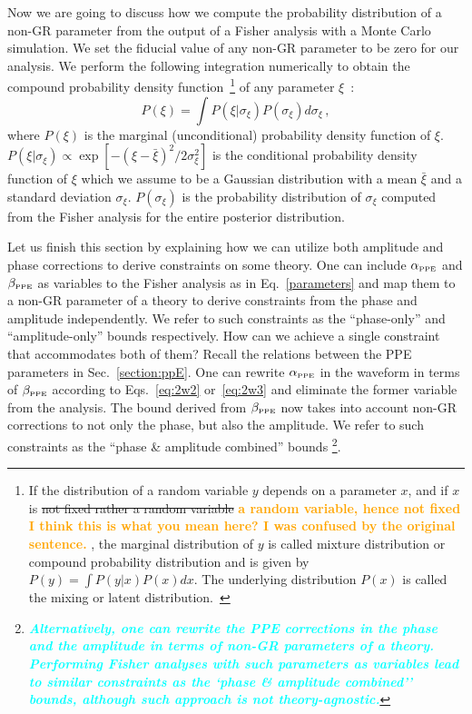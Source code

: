\documentclass[prd,twocolumn,nofootinbib]{revtex4-1}
\newcommand\be{\begin{equation}}
\newcommand\ee{\end{equation}}
\newcommand{\lb}{\left(}
\newcommand{\rb}{\right)}
\newcommand{\PPE}{{\mbox{\tiny PPE}}}
\newcommand{\st}[1]{\textcolor{cyan}{\it{\textbf{ #1}}} }
\newcommand{\zack}[1]{\textcolor{orange}{\textbf{#1}} }
\begin{document}
Now we are going to discuss how we compute the probability distribution of a non-GR parameter from the output of a Fisher analysis with a Monte Carlo simulation. We set the  fiducial value of any non-GR parameter to be zero for our analysis. We perform the following integration numerically to obtain the compound probability density function~\footnote{If the distribution of a random variable $y$ depends on a parameter $x$, and if $x$ is \sout{not fixed rather a random variable} \zack{a random variable, hence not fixed}\zack{I think this is what you mean here? I was confused by the original sentence.}, the marginal distribution of $y$ is called mixture distribution or compound probability distribution and is given by $P\left(y\right)=\int P\left(y|x\right) P\left(x\right)dx$. The underlying distribution $P\left(x\right)$ is called the mixing or latent distribution.~\cite{2016arXiv160204060R}} of any parameter $\xi$~:
\be
\label{eq3:1}
P\lb\xi\rb=\int P\lb \xi|\sigma_{\xi}\rb P\lb \sigma_{\xi}\rb d\sigma_{\xi}\,,
\ee
where $P\lb\xi\rb$ is the marginal (unconditional) probability density function of $\xi$. $P\lb \xi|\sigma_{\xi}\rb \propto \exp[-(\xi-\bar \xi)^2/2\sigma_{\xi}^2]$ is the conditional probability density function of $\xi$ which we assume to be a Gaussian distribution with a mean $\bar \xi$ and a standard deviation $\sigma_\xi$. $P\lb\sigma_\xi\rb$ is the probability distribution of $\sigma_\xi$ computed from the Fisher analysis for the entire posterior distribution.


Let us finish this section by explaining how we can utilize both amplitude and phase corrections to derive constraints on some theory. One can include $\alpha_{\PPE}$ and $\beta_{\PPE}$ as variables to the Fisher analysis as in Eq.~\eqref{parameters} and map them to a non-GR parameter of a theory to derive constraints from the phase and amplitude independently. We refer to such constraints as  the ``phase-only'' and ``amplitude-only'' bounds respectively. How can we achieve a single constraint that accommodates both of them? Recall the relations between the PPE parameters in Sec.~\ref{section:ppE}. One can rewrite $\alpha_{\PPE}$ in the waveform in terms of $\beta_{\PPE}$ according to Eqs.~\eqref{eq:2w2} or~\eqref{eq:2w3} and eliminate the former variable from the analysis. The bound derived from $\beta_{\PPE}$ now takes into account non-GR corrections to not only the phase, but also the amplitude. We refer to such constraints as the ``phase \& amplitude combined'' bounds
\footnote{\st{Alternatively, one can rewrite the PPE corrections in the phase and the amplitude  in terms of non-GR parameters of a theory. Performing Fisher analyses with such parameters as variables lead to similar constraints as the `phase \& amplitude combined'' bounds, although such approach is not theory-agnostic.}}.
\end{document}
